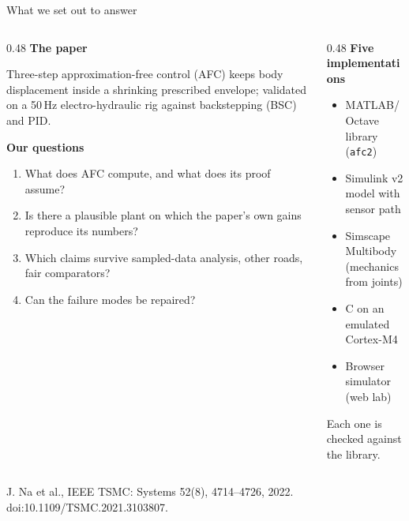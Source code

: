 \documentclass[aspectratio=169,10pt]{beamer}
\newcommand{\source}[1]{\vfill{\color{muted}\scriptsize #1}}
\begin{document}
\begin{frame}{What we set out to answer}
\begin{columns}[T]
\begin{column}{0.48\linewidth}
{\color{accent}\large\bfseries The paper}\par\vspace{0.15cm}
Three-step approximation-free control (AFC) keeps body displacement inside a shrinking prescribed envelope; validated on a 50\,Hz electro-hydraulic rig against backstepping (BSC) and PID.
\vspace{0.25cm}

{\color{accent}\large\bfseries Our questions}\par\vspace{0.1cm}
\small\begin{enumerate}\itemsep0pt
\item What does AFC compute, and what does its proof assume?
\item Is there a plausible plant on which the paper's own gains reproduce its numbers?
\item Which claims survive sampled-data analysis, other roads, fair comparators?
\item Can the failure modes be repaired?
\end{enumerate}
\end{column}
\begin{column}{0.48\linewidth}
{\color{warm}\large\bfseries Five implementations}\par\vspace{0.15cm}
\begin{itemize}\itemsep2pt
\item MATLAB/Octave library (\texttt{afc2})
\item Simulink v2 model with sensor path
\item Simscape Multibody (mechanics from joints)
\item C on an emulated Cortex-M4
\item Browser simulator (web lab)
\end{itemize}
\vspace{0.3cm}
Each one is checked against the library.
\end{column}
\end{columns}
\source{J. Na et al., IEEE TSMC: Systems 52(8), 4714--4726, 2022. doi:10.1109/TSMC.2021.3103807.}
\end{frame}
\end{document}
